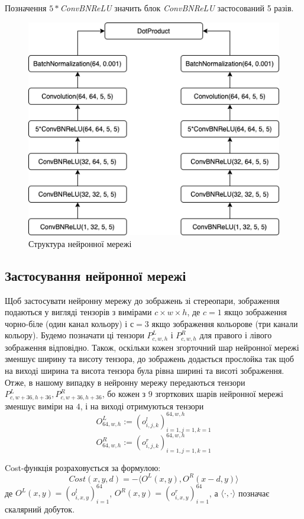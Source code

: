 \documentclass{article}
\theoremstyle{definition}
\begin{document}
Позначення $5*$\textit{ConvBNReLU} значить блок \textit{ConvBNReLU} застосований 5 разів.
	
\begin{figure}[h]
	\includegraphics[width=\linewidth]{nn_structure_prod}
	\centering
	\caption{Структура нейронної мережі}
	\label{fig:nn_structure}
\end{figure}

\subsection{Застосування нейронної мережі}
Щоб застосувати нейронну мережу до зображень зі стереопари, зображення подаються у вигляді тензорів з вимірами $c \times w \times h$, де $c=1$ якщо зображення чорно-біле (один канал кольору) і $с=3$ якщо зображення кольорове (три канали кольору). Будемо позначати ці тензори $P^L_{c, w, h}$ і $P^R_{c, w, h}$ для правого і лівого зображення відповідно. Також, оскільки кожен згорточний шар нейронної мережі зменшує ширину та висоту тензора, до зображень додається прослойка так щоб на виході ширина та висота тензора була рівна ширині та висоті зображення. Отже, в нашому випадку в нейронну мережу передаються тензори $P^L_{c, w+36, h+36}, P^R_{c, w+36, h+36}$, бо кожен з $9$ згорткових шарів нейронної мережі зменшує виміри на $4$, і на виході отримуються тензори
\[ O^L_{64, w, h} := (o^l_{i,j,k})_{i=1,j=1,k=1}^{64,w,h} \]
\[ O^R_{64, w, h} := (o^r_{i,j,k})_{i=1,j=1,k=1}^{64,w,h} \]

Cost-функція розраховується за формулою:
\[ Cost(x, y, d) = - \langle O^L(x, y), O^R(x - d, y) \rangle \]
де $O^L(x, y) = (o^l_{i,x,y})_{i=1}^{64}$, $O^R(x, y) = (o^r_{i,x,y})_{i=1}^{64}$, а $\langle \cdot, \cdot \rangle$ позначає скалярний добуток.
\end{document}
